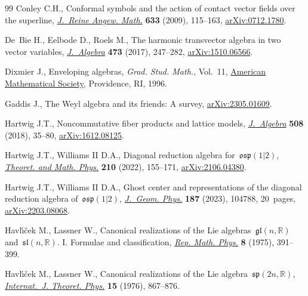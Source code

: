 \documentclass[pdftex]{sigma}
\numberwithin{equation}{section}
\begin{document}
\begin{thebibliography}{99}
Conley C.H., Conformal symbols and the action of contact vector fields over the
 superline, \href{https://doi.org/10.1515/CRELLE.2009.062}{\textit{J.~Reine Angew. Math.}} \textbf{633} (2009), 115--163,
 \href{https://arxiv.org/abs/0712.1780}{arXiv:0712.1780}.

De~Bie H., Eelbode D., Roels M., The harmonic transvector algebra in two vector
 variables, \href{https://doi.org/10.1016/j.jalgebra.2016.10.039}{\textit{J.~Algebra}} \textbf{473} (2017), 247--282,
 \href{https://arxiv.org/abs/1510.06566}{arXiv:1510.06566}.

Dixmier J., Enveloping algebras, \textit{Grad. Stud. Math.}, Vol.~11, \href{https://doi.org/10.1090/gsm/011}{American
 Mathematical Society}, Providence, RI, 1996.

Gaddis J., The {W}eyl algebra and its friends: {A} survey, \href{https://arxiv.org/abs/2305.01609}{arXiv:2305.01609}.

Hartwig J.T., Noncommutative fiber products and lattice models,
 \href{https://doi.org/10.1016/j.jalgebra.2018.04.015}{\textit{J.~Algebra}} \textbf{508} (2018), 35--80, \href{https://arxiv.org/abs/1612.08125}{arXiv:1612.08125}.

Hartwig J.T., Williams II D.A., Diagonal reduction algebra
 for~{$\mathfrak{osp}(1|2)$}, \href{https://doi.org/10.1134/S0040577922020015}{\textit{Theoret. and Math. Phys.}} \textbf{210}
 (2022), 155--171, \href{https://arxiv.org/abs/2106.04380}{arXiv:2106.04380}.

Hartwig J.T., Williams II D.A., Ghost center and representations of the
 diagonal reduction algebra of~{$\mathfrak{osp}(1|2)$}, \href{https://doi.org/10.1016/j.geomphys.2023.104788}{\textit{J.~Geom.
 Phys.}} \textbf{187} (2023), 104788, 20~pages, \href{https://arxiv.org/abs/2203.08068}{arXiv:2203.08068}.

Havl\'{\i}\v{c}ek M., Lassner W., Canonical realizations of the {L}ie
 algebras~{$\mathfrak{gl}(n,\mathbb{R})$} and~{$\mathfrak{sl}(n,\mathbb{R})$}.
 {I}. {F}ormulae and classification, \href{https://doi.org/10.1016/0034-4877(75)90081-6}{\textit{Rep. Math. Phys.}}
 \textbf{8} (1975), 391--399.

Havl\'{\i}\v{c}ek M., Lassner W., Canonical realizations of the {L}ie
 algebra~{$\mathfrak{sp}(2n, \mathbb{R})$}, \href{https://doi.org/10.1007/BF01807449}{\textit{Internat.~J. Theoret.
 Phys.}} \textbf{15} (1976), 867--876.


\end{thebibliography}
\end{document}
